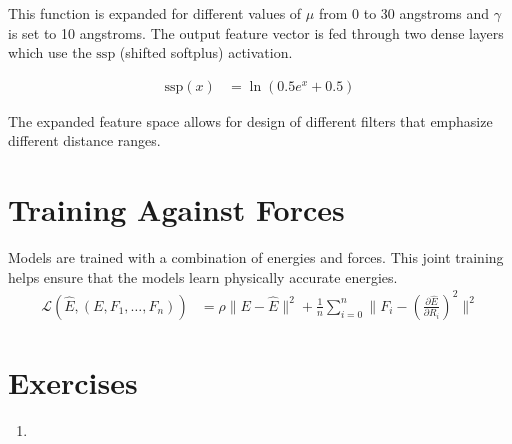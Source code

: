 \documentclass[book.tex]{subfiles}
\begin{document}
This function is expanded for different values of $\mu$ from 0 to 30 angstroms and $\gamma$ is set to 10 angstroms. The output feature vector is fed through two dense layers which use the $\textrm{ssp}$ (shifted softplus) activation.

\begin{align}
\textrm{ssp}(x) &= \ln ( 0.5 e^x + 0.5 )
\end{align}

The expanded feature space allows for design of different filters that emphasize different distance ranges.


\section{Training Against Forces}

Models are trained with a combination of energies and forces. This joint training helps ensure that the models learn physically accurate energies.
\begin{align}
\mathcal{L}(\hat{E}, (E, F_1,\dotsc,F_n)) &= \rho \|E - \hat{E}\|^2 + \frac{1}{n} \sum_{i=0}^n \|F_i  - \left ( \frac{\partial \hat{E}}{\partial R_i} \right )^2 \|^2 
\end{align}

\section{Exercises}

\begin{enumerate}
    \item 
\end{enumerate}
\end{document}
